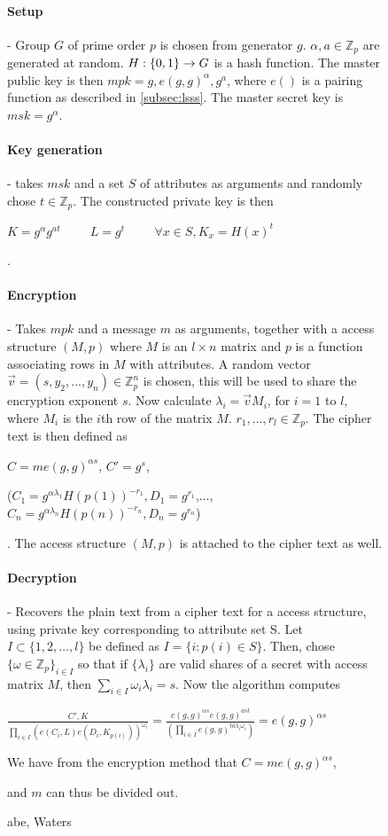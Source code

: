 \begin{figure}
\begin{mdframed}
\paragraph{Setup} - Group $G$ of prime order $p$ is chosen from generator $g$. $\alpha, a \in \mathbb{Z}_p$ are generated at random. $H: \{0,1\}\* \rightarrow G$ is a hash function. The master public key is then $mpk = g, e(g,g)^{\alpha}, g^a$, where $e()$ is a pairing function as described in \ref{subsec:lsss}. The master secret key is $msk = g^{\alpha}$.
\
\paragraph{Key generation} - takes $msk$ and a set $S$ of attributes as arguments and randomly chose $t \in \mathbb{Z}_p$. The constructed private key is then \\ \centerline{$K = g^{\alpha}g^{at}\hspace{1cm} L = g^t \hspace{1cm}   \forall x\in S, K_x = H(x)^t$}.
\\
\paragraph{Encryption} - Takes $mpk$ and a message $m$ as arguments, together with a access structure $(M,p)$ where $M$ is an $l\times n$ matrix and $p$ is a function associating rows in $M$ with attributes. A random vector $\vec{v} = (s, y_2, ..., y_n)\in \mathbb{Z}_p^n$ is chosen, this will be used to share the encryption exponent $s$. Now calculate $\lambda_i = \vec{v} M_i$, for $i=1$ to $l$, where $M_i$ is the $i$th row of the matrix $M$. $r_1,\dots,r_l \in \mathbb{Z}_p$. The cipher text is then defined as\\
\centerline{$C=me(g,g)^{\alpha s}$, $C'=g^s$,}
\centerline{($C_1 = g^{\alpha \lambda_1} H(p(1))^{-r_1}, D_1=g^{r_1}$,$\dots$,$C_n = g^{\alpha \lambda_n} H(p(n))^{-r_n}, D_n=g^{r_n}$)}.
The access structure $(M,p)$ is attached to the cipher text as well.
\\
\paragraph{Decryption} - Recovers the plain text from a cipher text for a access structure, using private key corresponding to attribute set S. Let $I \subset \{1,2,\dots,l\}$ be defined as $I = \{i : p(i) \in S\}$. Then, chose $\{\omega \in \mathbb{Z}_p\}_{i\in I}$ so that if $\{\lambda_i\}$ are valid shares of a secret with access matrix $M$, then $\sum_{i\in I}\omega_i \lambda_i = s$. Now the algorithm computes
\centerline{$\frac{C',K }{\prod_{i\in I}(e(C_i,L)e(D_i,K_{p(i)}))^{\omega_i}} = \frac{e(g,g)^{\alpha s}e(g,g)^{ast}}{(\prod_{i\in I}e(g,g)^{ta\lambda_i\omega_i})}=e(g,g)^{\alpha s}$}
\centerline{We have from the encryption method that $C=me(g,g)^{\alpha s}$, }
\centerline{and $m$ can thus be divided out.}

\caption{\gls{abe}, Waters\cite{abe_waters09}}
\label{fig:abe_math}
\end{mdframed}
\end{figure}

